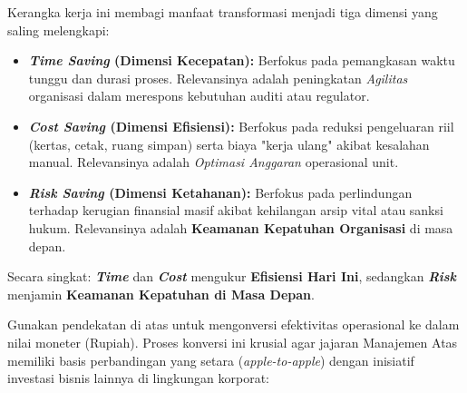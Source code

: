 \documentclass[12pt,a4paper]{report}
\begin{document}
\begin{plnbox}
\small
Kerangka kerja ini membagi manfaat transformasi menjadi tiga dimensi yang saling melengkapi:
\begin{itemize}[leftmargin=*]
    \item \textbf{\textit{Time Saving} (Dimensi Kecepatan):} Berfokus pada pemangkasan waktu tunggu dan durasi proses. Relevansinya adalah peningkatan \textit{Agilitas} organisasi dalam merespons kebutuhan auditi atau regulator.
    \item \textbf{\textit{Cost Saving} (Dimensi Efisiensi):} Berfokus pada reduksi pengeluaran riil (kertas, cetak, ruang simpan) serta biaya "kerja ulang" akibat kesalahan manual. Relevansinya adalah \textit{Optimasi Anggaran} operasional unit.
    \item \textbf{\textit{Risk Saving} (Dimensi Ketahanan):} Berfokus pada perlindungan terhadap kerugian finansial masif akibat kehilangan arsip vital atau sanksi hukum. Relevansinya adalah \textbf{Keamanan Kepatuhan Organisasi} di masa depan.
\end{itemize}
Secara singkat: \textbf{\textit{Time}} dan \textbf{\textit{Cost}} mengukur \textbf{Efisiensi Hari Ini}, sedangkan \textbf{\textit{Risk}} menjamin \textbf{Keamanan Kepatuhan di Masa Depan}.
\end{plnbox}

Gunakan pendekatan di atas untuk mengonversi efektivitas operasional ke dalam nilai moneter (Rupiah). Proses konversi ini krusial agar jajaran Manajemen Atas memiliki basis perbandingan yang setara (\textit{apple-to-apple}) dengan inisiatif investasi bisnis lainnya di lingkungan korporat:
\end{document}
